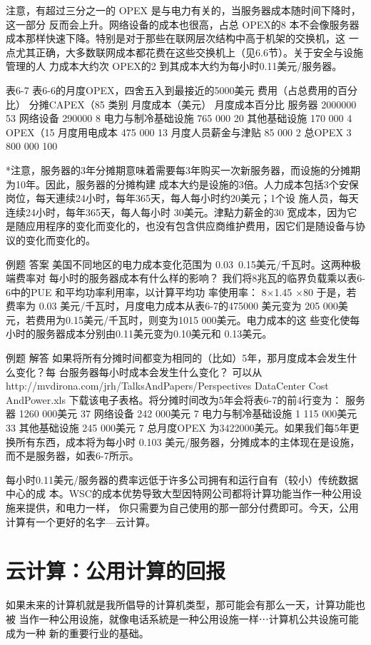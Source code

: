 注意，有超过三分之一的 OPEX 是与电力有关的，当服务器成本随时间下降时，这一部分
反而会上升。网络设备的成本也很高，占总 OPEX的8%
本不会像服务器成本那样快速下降。特别是对于那些在联网层次结构中高于机架的交换机，这
一点尤其正确，大多数联网成本都花费在这些交换机上（见6.6节）。关于安全与设施管理的人
力成本大约次 OPEX的2%
到其成本大约为每小时0.11美元/服务器。

表6-7 表6-6的月度OPEX，四舍五入到最接近的5000美元
费用（占总费用的百分比）
分摊CAPEX（85%
类别
月度成本（美元）
月度成本百分比
服务器
2000000
53%
网络设备
290000
8%
电力与制冷基础设施
765 000
20%
其他基础设施
170 000
4%
OPEX（15%
月度用电成本
475 000
13%
月度人员薪金与津贴
85 000
2%
总OPEX
3 800 000
100%

*注意，服务器的3年分摊期意味着需要每3年购买一次新服务器，而设施的分摊期为10年。因此，服务器的分摊构建
成本大约是设施的3倍。人力成本包括3个安保岗位，每天連续24小时，每年365天，每人每小时约20美元；1个设
施人员，每天连续24小时，每年365天，每人每小时 30美元。津點力薪金的30%
宽成本，因为它是随应用程序的变化而变化的，也没有包含供应商维护费用，因它们是随设备与协议的变化而变化的。

例题
答案
美国不同地区的电力成本变化范围为 0.03~0.15美元/千瓦时。这两种极端费率对
每小时的服务器成本有什么样的影响？
我们将8兆瓦的临界负载乘以表6-6中的PUE 和平均功率利用率，以计算平均功
率使用率：
8×1.45 ×80%
于是，若费率为 0.03 美元/千瓦时，月度电力成本从表6-7的475000 美元变为
205 000美元，若费用为0.15美元/千瓦时，则变为1015 000美元。电力成本的这
些变化使每小时的服务器成本分别由0.11美元变为0.10美元和 0.13美元。

例题
解答
如果将所有分摊时间都变为相同的（比如）5年，那月度成本会发生什么变化？每
台服务器每小时成本会发生什么变化？
可以从 http://mvdirona.com/jrh/TalksAndPapers/Perspectives DataCenter Cost AndPower.xls
下载该电子表格。将分摊时间改为5年会将表6-7的前4行变为：
服务器
1260 000美元
37%
网络设备
242 000美元
7%
电力与制冷基础设施
1 115 000美元
33%
其他基础设施
245 000美元
7%
总月度OPEX 为3422000美元。如果我们每5年更换所有东西，成本将为每小时
0.103 美元/服务器，分摊成本的主体现在是设施，而不是服务器，如表6-7所示。

每小时0.11美元/服务器的费率远低于许多公司拥有和运行自有（较小）传统数据中心的成
本。WSC的成本优势导致大型因特网公司都将计算功能当作一种公用设施来提供，和电力一样，
你只需要为自己使用的那一部分付费即可。今天，公用计算有一个更好的名字—云计算。

\section{云计算：公用计算的回报}
如果未来的计算机就是我所倡导的计算机类型，那可能会有那么一天，计算功能也被
当作一种公用设施，就像电话系統是一种公用设施一样⋯计算机公共设施可能成为一种
新的重要行业的基础。

